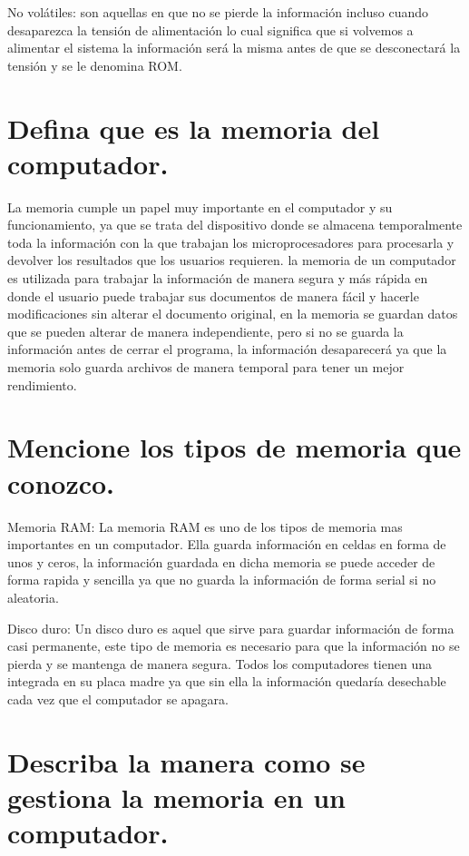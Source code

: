 \documentclass{article}
\begin{document}
No volátiles: son aquellas en que no se pierde la información incluso cuando desaparezca la tensión de alimentación lo cual significa que si volvemos a alimentar el sistema la información será la misma antes de que se desconectará la tensión y se le denomina ROM.


\section{Defina que es la memoria del computador.}

La memoria cumple un papel muy importante en el computador y su funcionamiento, ya que se trata del dispositivo donde se almacena temporalmente toda la información con la que trabajan
los microprocesadores para procesarla y devolver los resultados que los usuarios requieren.
la memoria de un computador es utilizada para trabajar la información de manera segura y más rápida en donde el usuario puede trabajar sus documentos de manera fácil y hacerle modificaciones sin alterar el documento original, en la memoria se guardan datos que se pueden alterar de manera independiente, pero si no se guarda la información antes de cerrar el programa, la información desaparecerá ya que la memoria solo guarda archivos de manera temporal para tener un mejor rendimiento.


\section{Mencione los tipos de memoria que conozco.} \label{contenido}

Memoria RAM: La memoria RAM es uno de los tipos de memoria mas
importantes en un computador. Ella guarda información en celdas en forma de unos y ceros, la información guardada en dicha memoria se puede acceder de forma rapida y sencilla ya que no guarda la información de forma serial si no
aleatoria.

Disco duro: Un disco duro es aquel que sirve para guardar información de forma casi permanente, este tipo de memoria es necesario para que la información no se pierda y se mantenga de manera segura. Todos los computadores
tienen una integrada en su placa madre ya que sin ella la información quedaría desechable cada vez que el computador se apagara.


\section{Describa la manera como se gestiona la memoria en un computador.}
\end{document}
